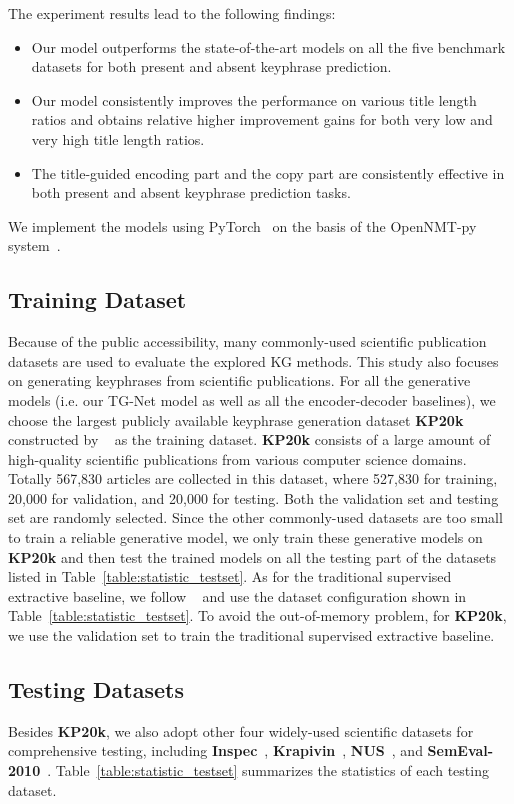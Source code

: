 \documentclass[letterpaper]{article} %
\begin{document}
The experiment results lead to the following findings:
\begin{itemize}
\item Our model outperforms the state-of-the-art models on all the five benchmark datasets for both present and absent keyphrase prediction.
\item Our model consistently improves the performance on various title length ratios and obtains relative higher improvement gains for both very low and very high title length ratios.
\item The title-guided encoding part and the copy part are consistently effective in both present and absent keyphrase prediction tasks.
\end{itemize}
We implement the models using PyTorch~\cite{paszke2017pytorch} on the basis of the OpenNMT-py system~\cite{opennmt}.

\subsection{Training Dataset} \label{subsection:training_set}
Because of the public accessibility, many commonly-used scientific publication datasets are used to evaluate the explored KG methods. This study also focuses on generating keyphrases from scientific publications.
For all the generative models (i.e. our TG-Net model as well as all the encoder-decoder baselines), we choose the largest publicly available keyphrase generation dataset \textbf{KP20k} constructed by \citeauthor{meng2017dkg}~ as the training dataset. \textbf{KP20k} consists of a large amount of high-quality scientific publications from various computer science domains. Totally 567,830 articles are collected in this dataset, where 527,830 for training, 20,000 for validation, and 20,000 for testing. Both the validation set and testing set are randomly selected. Since the other commonly-used datasets are too small to train a reliable generative model, we only train these generative models on \textbf{KP20k} and then test the trained models on all the testing part of the datasets listed in Table~\ref{table:statistic_testset}. As for the traditional supervised extractive baseline, we follow \citeauthor{meng2017dkg}~ and use the dataset configuration shown in Table~\ref{table:statistic_testset}. To avoid the out-of-memory problem, for \textbf{KP20k}, we use the validation set to train the traditional supervised extractive baseline.

\subsection{Testing Datasets}
Besides \textbf{KP20k}, we also adopt other four widely-used scientific datasets for comprehensive testing, including \textbf{Inspec}~\cite{hulth2003improved}, \textbf{Krapivin}~\cite{krapivin2009large}, \textbf{NUS}~\cite{nguyen2007KE_sci_publications}, and \textbf{SemEval-2010}~\cite{kim2010semeval}. Table~\ref{table:statistic_testset} summarizes the statistics of each testing dataset.
\end{document}
